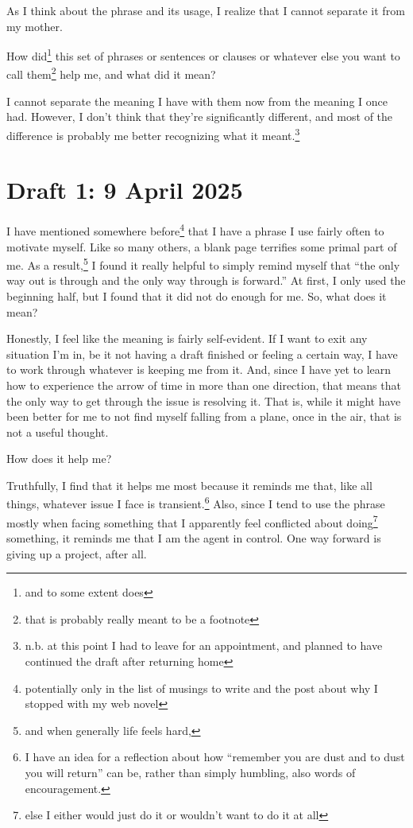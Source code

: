 \documentclass[12pt]{article}
\newcommand{\say}[1]{``#1''}
\renewcommand{\,}{\textsuperscript{,}}
\begin{document}
As I think about the phrase and its usage, I realize that I cannot separate it from my mother.

How did\footnote{and to some extent does} this set of phrases or sentences or clauses or whatever else you want to call them\footnote{that is probably really meant to be a footnote} help me, and what did it mean?

I cannot separate the meaning I have with them now from the meaning I once had.  
However, I don't think that they're significantly different, and most of the difference is probably me better recognizing what it meant.\footnote{n.b. at this point I had to leave for an appointment, and planned to have continued the draft after returning home}

\section{Draft 1: 9 April 2025}

I have mentioned somewhere before\footnote{potentially only in the list of musings to write and the post about why I stopped with my web novel} that I have a phrase I use fairly often to motivate myself.  
Like so many others, a blank page terrifies some primal part of me.  
As a result,\footnote{and when generally life feels hard,} I found it really helpful to simply remind myself that \say{the only way out is through and the only way through is forward.}  
At first, I only used the beginning half, but I found that it did not do enough for me.  
So, what does it mean?

Honestly, I feel like the meaning is fairly self-evident.  
If I want to exit any situation I'm in, be it not having a draft finished or feeling a certain way, I have to work through whatever is keeping me from it.  
And, since I have yet to learn how to experience the arrow of time in more than one direction, that means that the only way to get through the issue is resolving it.  
That is, while it might have been better for me to not find myself falling from a plane, once in the air, that is not a useful thought.

How does it help me?

Truthfully, I find that it helps me most because it reminds me that, like all things, whatever issue I face is transient.\footnote{I have an idea for a reflection about how \say{remember you are dust and to dust you will return} can be, rather than simply humbling, also words of encouragement.}  
Also, since I tend to use the phrase mostly when facing something that I apparently feel conflicted about doing\footnote{else I either would just do it or wouldn't want to do it at all} something, it reminds me that I am the agent in control.  
One way forward is giving up a project, after all.
\end{document}
